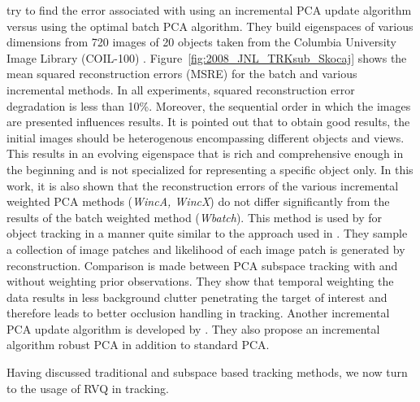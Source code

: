 \cite{2008_JNL_TRKsubs_Skocaj} try to find the error associated with using an incremental PCA update algorithm versus using the optimal batch PCA algorithm.  They build eigenspaces of various dimensions from 720 images of 20 objects taken from the Columbia University Image Library (COIL-100)  \cite{Web_COIL}.  Figure~\ref{fig:2008_JNL_TRKsub_Skocaj} shows the mean squared reconstruction errors (MSRE) for the batch and various incremental methods.  In all experiments, squared reconstruction error degradation is less than 10\%.  Moreover, the sequential order in which the images are presented influences results.  It is pointed out that to obtain good results, the initial images should be heterogenous encompassing different objects and views.  This results in an evolving eigenspace that is rich and comprehensive enough in the beginning and is not specialized for representing a specific object only.  In this work, it is also shown that the reconstruction errors of the various incremental weighted PCA methods (\emph{WincA, WincX}) do not differ significantly from the results of the batch weighted method (\emph{Wbatch}).  This method is used by \cite{2010_CNF_TRKsubs_Qian} for object tracking in a manner quite similar to the approach used in \cite{2008_JNL_subspaceTRK_Ross}.  They sample a collection of image patches and likelihood of each image patch is generated by reconstruction.  Comparison is made between PCA subspace tracking with and without weighting prior observations.  They show that temporal weighting the data results in less background clutter penetrating the target of interest and therefore leads to better occlusion handling in tracking.  Another incremental PCA update algorithm is developed by \cite{2004_JNL_TRKsubs_Li}.  They also propose an incremental algorithm robust PCA in addition to standard PCA.

Having discussed traditional and subspace based tracking methods, we now turn to the usage of RVQ in tracking.


